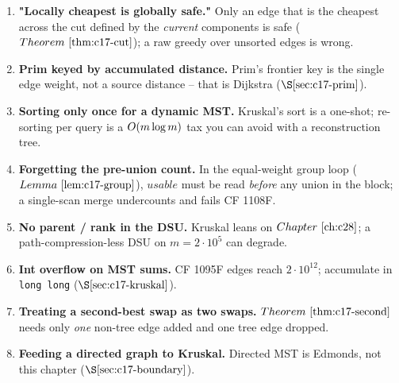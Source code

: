 
\begin{enumerate}[nosep]
  \item \textbf{"Locally cheapest is globally safe."}  Only an edge that is the
        cheapest across the cut defined by the \emph{current} components is safe
        (\(\thmref{c17-cut}\)); a raw greedy over unsorted edges is wrong.
  \item \textbf{Prim keyed by accumulated distance.}  Prim's frontier key is the
        single edge weight, not a source distance -- that is Dijkstra
        (\(\secref{c17-prim}\)).
  \item \textbf{Sorting only once for a dynamic MST.}  Kruskal's sort is a one-shot;
        re-sorting per query is a \(O(m\log m)\) tax you can avoid with a
        reconstruction tree.
  \item \textbf{Forgetting the pre-union count.}  In the equal-weight group loop
        (\(\lemref{c17-group}\)), \(\mathit{usable}\) must be read \emph{before}
        any union in the block; a single-scan merge undercounts and fails CF 1108F.
  \item \textbf{No parent / rank in the DSU.}  Kruskal leans on \(\chref{c28}\);
        a path-compression-less DSU on \(m=2\cdot10^5\) can degrade.
  \item \textbf{Int overflow on MST sums.}  CF 1095F edges reach \(2\cdot10^{12}\);
        accumulate in \texttt{long long} (\(\secref{c17-kruskal}\)).
  \item \textbf{Treating a second-best swap as two swaps.}  \(\thmref{c17-second}\)
        needs only \emph{one} non-tree edge added and one tree edge dropped.
  \item \textbf{Feeding a directed graph to Kruskal.}  Directed MST is Edmonds,
        not this chapter (\(\secref{c17-boundary}\)).
\end{enumerate}


